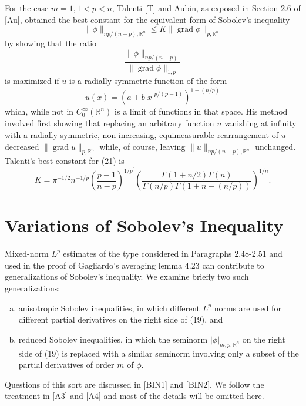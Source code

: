 \begin{remark}
  For the case $m=1,1<p<n$, Talenti [T] and Aubin, as exposed in Section 2.6 of [Au], obtained the best constant for the equivalent form of Sobolev's inequality
  \[
  \|\phi\|_{n p /(n-p), \mathbb{R}^n} \leq K\|\operatorname{grad} \phi\|_{p, \mathbb{R}^n}
  \]
  by showing that the ratio
  \[
  \frac{\|\phi\|_{n p /(n-p)}}{\|\operatorname{grad} \phi\|_{1, p}}
  \]
  is maximized if $u$ is a radially symmetric function of the form
  \[
  u(x)=\left(a+b|x|^{p /(p-1)}\right)^{1-(n / p)}
  \]
  which, while not in $C_0^{\infty}\left(\mathbb{R}^n\right)$ is a limit of functions in that space. His method involved first showing that replacing an arbitrary function $u$ vanishing at infinity
  with a radially symmetric, non-increasing, equimeasurable rearrangement of $u$ decreased $\|\operatorname{grad} u\|_{p, \mathbb{R}^n}$ while, of course, leaving $\|u\|_{n p /(n-p), \mathbb{R}^n}$ unchanged. Talenti's best constant for (21) is
  \[
  K=\pi^{-1 / 2} n^{-1 / p}\left(\frac{p-1}{n-p}\right)^{1 / p^{\prime}}\left(\frac{\Gamma(1+n / 2) \Gamma(n)}{\Gamma(n / p) \Gamma(1+n-(n / p))}\right)^{1 / n}.
  \]
\end{remark}


\section{Variations of Sobolev's Inequality}


\begin{para}
  Mixed-norm $L^p$ estimates of the type considered in Paragraphs 2.48-2.51 and used in the proof of Gagliardo's averaging lemma 4.23 can contribute to generalizations of Sobolev's inequality. We examine briefly two such generalizations:
  
  \begin{enumerate}[(a)]
    \item anisotropic Sobolev inequalities, in which different $L^p$ norms are used for different 
      partial derivatives on the right side of (19), and
    \item reduced Sobolev inequalities, in which the seminorm $|\phi|_{m, p, \mathbb{R}^n}$ on the 
      right side of (19) is replaced with a similar seminorm involving only a subset of the partial 
      derivatives of order $m$ of $\phi$.
  \end{enumerate}
  
  Questions of this sort are discussed in [BIN1] and [BIN2]. We follow the treatment in [A3] and [A4] and most of the details will be omitted here.
\end{para}


